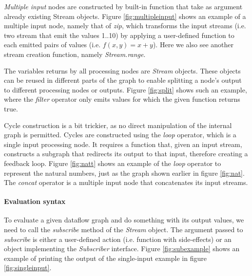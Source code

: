\documentclass[sigplan,review,anonymous]{acmart}
\begin{document}

\textit{Multiple input} nodes are constructed by built-in function that take as
argument already existing Stream objects. Figure \ref{fig:multipleinput} shows
an example of a multiple input node, namely that of \textit{zip}, which
transforms the input streams (i.e. two stream that emit the values 1..10) by
applying a user-defined function to each emitted pairs of values (i.e.
$f(x,y)=x+y$). Here we also see another stream creation function, namely
\textit{Stream.range}.


The variables returns by all processing nodes are \textit{Stream} objects. These
objects can be reused in different parts of the graph to enable splitting a
node's output to different processing nodes or outputs. Figure \ref{fig:split}
shows such an example, where the \textit{filter} operator only emits values for
which the given function returns true.


Cycle construction is a bit trickier, as no direct manipulation of the internal
graph is permitted. Cycles are constructed using the \textit{loop} operator,
which is a single input processing node. It requires a function that, given an
input stream, constructs a subgraph that redirects its output to that input,
therefore creating a feedback loop. Figure \ref{fig:natt} shows an example of
the \textit{loop} operator to represent the natural numbers, just as the graph
shown earlier in figure \ref{fig:nat}. The \textit{concat} operator is a
multiple input node that concatenates its input streams.


\paragraph{Evaluation syntax}
To evaluate a given dataflow graph and do something with its output values, we
need to call the \textit{subscribe} method of the \textit{Stream} object. The
argument passed to \textit{subscribe} is either a user-defined action (i.e.
function with side-effects) or an object implementing the \textit{Subscriber}
interface. Figure \ref{fig:subexample} shows an
example of printing the output of the single-input example in figure
\ref{fig:singleinput}.
\end{document}

